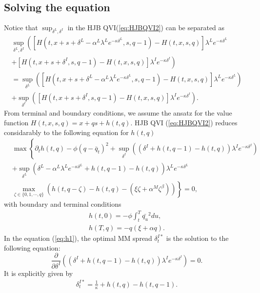 \documentclass[12pt]{article}
\begin{document}
\subsection{Solving the equation}
Notice that $\sup_{\delta^L, \delta^I}$ in the HJB QVI(\ref{eq:HJBQVI2}) can be separated as
\begin{align*}
    \sup_{\delta^L, \delta^I}\left([H(t, x+ s+\delta^L-\alpha^L\lambda^L e^{-\kappa \delta^L} , s, q -1) - H(t, x, s, q)]\lambda^L e^{-\kappa \delta^L}  \right.\\
    \left.+ [H(t, x+ s+\delta^I, s, q-1 ) - H(t, x, s, q)]\lambda^I e^{-\kappa \delta^I}   \right)\\
    =\sup_{\delta^L}\left([H(t, x+ s+\delta^L-\alpha^L\lambda^L e^{-\kappa \delta^L} , s, q -1) - H(t, x, s, q)]\lambda^L e^{-\kappa \delta^L} \right)  \\
    + \sup_{\delta^I}\left([H(t, x+ s+\delta^I, s, q-1 ) - H(t, x, s, q)]\lambda^I e^{-\kappa \delta^I}  \right).
\end{align*}
From terminal and boundary conditions, we assume the ansatz for the value function
$H(t, x, s, q) = x + qs + h(t, q).$ 
HJB QVI (\ref{eq:HJBQVI2}) reduces considarably to the following equation for $h(t, q)$
\begin{align}
  &\max\left\{\partial_t h(t,q)-\phi (q-\bar{q}_t)^2  +\sup_{\delta^I} \left(\left(\delta^I + h(t, q-1)-h(t, q) \right)\lambda^I e^{-\kappa \delta^I} \right)\right.\nonumber\\
  &\left.+\sup_{\delta^L}  \left(\delta^L - \alpha^L\lambda^L e^{-\kappa \delta^L}+h(t, q-1)-h(t, q) \right)\lambda^L e^{-\kappa \delta^L} \right. \nonumber\\
  &\left. \max_{\zeta\in \{0, 1, \cdots, q\}} \left(h(t, q-\zeta) - h(t, q) - (\xi \zeta + \alpha^M\zeta^{\beta} )\right) \right\} =0, \label{eq:h1}
\end{align}
with boundary and terminal conditions
\begin{align*}
  h(t,0) =  -\phi \int_t^T \bar{q_u}^2 du,\\
  h(T,q) = - q(\xi + \alpha q).
\end{align*}
In the equation (\ref{eq:h1}), the optimal MM spread $\delta^{I*}_t$ is the solution to the following equation:
$$\frac{\partial}{\partial {\delta^I}}\left(\left(\delta^I + h(t, q-1)-h(t, q) \right)\lambda^I e^{-\kappa \delta^I} \right)= 0. $$
It is explicitly given by
\begin{align}
  \delta^{I*}_t = \frac{1}{\kappa} + h(t, q) - h(t, q-1). \label{eq:delta^I}
\end{align}
\end{document}
